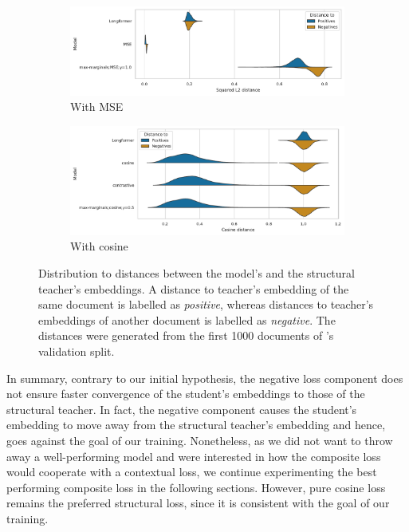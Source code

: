 \begin{figure}
  \centering
  \begin{subfigure}{\textwidth}
    \includegraphics[width=\textwidth]{img/composite_mse_distances.pdf}
    \caption{With MSE}

    \label{fig:composite_mse_distances}

  \end{subfigure}
  \begin{subfigure}{\textwidth}

    \includegraphics[width=\textwidth]{img/composite_cos_distances.pdf}
    \caption{With cosine}

    \label{fig:composite_cos_distances}
  \end{subfigure}

  \caption{Distribution to distances between the model's and the structural
  teacher's embeddings. A distance to teacher's embedding of the same document
  is labelled as \emph{positive}, whereas distances to teacher's embeddings of
  another document is labelled as \emph{negative}. The distances were generated
  from the first 1000 documents of 's validation split.}

  \label{fig:composite_distances}

\end{figure}

In summary, contrary to our initial hypothesis, the negative loss component
does not ensure faster convergence of the student's embeddings to those of the
structural teacher. In fact, the negative component causes the student's
embedding to move away from the structural teacher's embedding and hence, goes
against the goal of our training. Nonetheless, as we did not want to throw away
a well-performing model and were interested in how the composite loss would
cooperate with a contextual loss, we continue experimenting the best performing
composite loss in the following sections. However, pure cosine loss remains the
preferred structural loss, since it is consistent with the goal of our
training.

